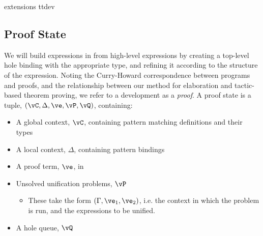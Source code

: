 {\TTdev{} extensions}
{ttdev}


\subsection{Proof State}

\label{sect:prfstate}

We will build expressions in \TT{} from high-level \Idris{} expressions by
creating a top-level hole binding with the appropriate type, and refining it
according to the structure of the \Idris{} expression. Noting the Curry-Howard
correspondence between programs and proofs, and the relationship between our
method for elaboration and tactic-based theorem proving, we refer to a development as a \emph{proof}.
A proof state is a tuple, $(\vC, \Delta, \ve, \vP, \vQ)$, containing:

\begin{itemize}
\item A global context, $\vC$, containing pattern matching definitions and their types
\item A local context, $\Delta$, containing pattern bindings
\item A proof term, $\ve$, in \TTdev{}
\item Unsolved unification problems, $\vP$
\begin{itemize}
\item These take the form $(\Gamma,\ve_1,\ve_2)$, i.e. the context in which
the problem is run, and the expressions to be unified.
\end{itemize}
\item A hole queue, $\vQ$
\end{itemize}

